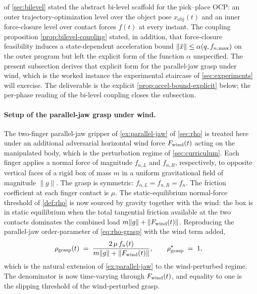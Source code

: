  of \cref{sec:bilevel} stated the abstract
bi-level scaffold for the pick--place OCP: an outer
trajectory-optimization level over the object pose
$x_{\mathrm{obj}}(t)$ and an inner force-closure level over
contact forces $f(t)$ at every instant. The coupling
proposition \cref{prop:bilevel-coupling} stated, in addition,
that force-closure feasibility induces a state-dependent
acceleration bound
$\|\ddot{x}\| \le \alpha(q, f_{n,\max})$ on the outer
program but left the explicit form of the function $\alpha$
unspecified. The present subsection derives that explicit form
for the parallel-jaw grasp under wind, which is the worked
instance the experimental staircase of \cref{sec:experiments}
will exercise. The deliverable is the explicit
\cref{prop:accel-bound-explicit} below; the per-phase reading
of the bi-level coupling closes the subsection.

\paragraph{Setup of the parallel-jaw grasp under wind.}
The two-finger parallel-jaw gripper of
\cref{ex:parallel-jaw} of \cref{sec:rho} is treated here under
an additional adversarial horizontal wind force $F_{\mathrm{wind}}(t)$
acting on the manipulated body, which is the perturbation regime
of \cref{sec:curriculum}. Each finger applies a normal force
of magnitude $f_{n,L}$ and $f_{n,R}$, respectively, to opposite
vertical faces of a rigid box of mass $m$ in a uniform
gravitational field of magnitude $\|g\|$. The grasp is symmetric:
$f_{n,L} = f_{n,R} = f_{n}$. The friction coefficient at each
finger contact is $\mu$. The static-equilibrium normal-force
threshold of \cref{def:rho} is now sourced by gravity together
with the wind: the box is in static equilibrium when the total
tangential friction available at the two contacts dominates
the combined load $m \|g\| + \|F_{\mathrm{wind}}(t)\|$. Reproducing the
parallel-jaw order-parameter of \cref{eq:rho-grasp} with the
wind term added,
\begin{equation}
\label{eq:rho-grasp-wind}
  \rho_{\mathrm{grasp}}(t)
  \;=\;
  \frac{2\, \mu\, f_{n}(t)}{m \|g\| + \|F_{\mathrm{wind}}(t)\|},
  \qquad
  \rho_{\mathrm{grasp}}^{\star} \;=\; 1,
\end{equation}
which is the natural extension of \cref{ex:parallel-jaw} to the
wind-perturbed regime. The denominator is now time-varying
through $F_{\mathrm{wind}}(t)$, and equality to one is the slipping
threshold of the wind-perturbed grasp.

